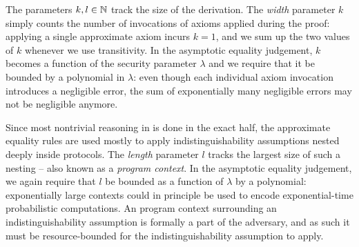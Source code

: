 The parameters $k, l \in \mathbb{N}$ track the size of the derivation. The \emph{width} parameter $k$ simply counts the number of invocations of axioms applied during the proof: applying a single approximate axiom incurs $k = 1$, and we sum up the two values of $k$ whenever we use transitivity. In the asymptotic equality judgement, $k$ becomes a function of the security parameter $\lambda$ and we require that it be bounded by a polynomial in $\lambda$: even though each individual axiom invocation introduces a negligible error, the sum of exponentially many negligible errors may not be negligible anymore.

Since most nontrivial reasoning in \ipdl is done in the exact half, the approximate equality rules are used mostly to apply indistinguishability assumptions nested deeply inside protocols. The \emph{length} parameter $l$ tracks the largest size of such a nesting -- also known as a \emph{program context}. In the asymptotic equality judgement, we again require that $l$ be bounded as a function of $\lambda$ by a polynomial: exponentially large \ipdl contexts could in principle be used to encode exponential-time probabilistic computations. An \ipdl program context surrounding an indistinguishability assumption is formally a part of the adversary, and as such it must be resource-bounded for the indistinguishability assumption to apply.

